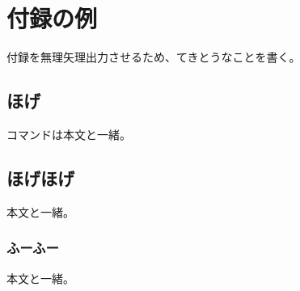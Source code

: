\chapter{付録の例}

付録を無理矢理出力させるため、てきとうなことを書く。

\section{ほげ}

コマンドは本文と一緒。

\section{ほげほげ}

本文と一緒。

\subsection{ふーふー}

本文と一緒。
